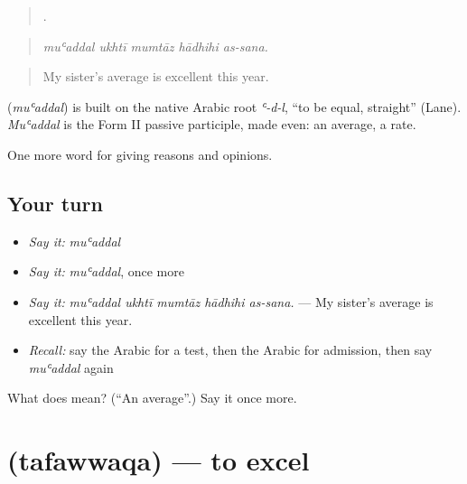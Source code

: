 \begin{quote}
    .
\end{quote}

\begin{quote}
\emph{muʿaddal ukhtī mumtāz hādhihi as-sana.}
\end{quote}

\begin{quote}
My sister's average is excellent this year.
\end{quote}

\begin{cousinweb}
\textbf{} (\emph{muʿaddal}) is built on the native Arabic root \emph{ʿ-d-l}, \textquotedblleft{}to be equal, straight\textquotedblright{} (Lane). \emph{Muʿaddal} is the Form II passive participle, made even: an average, a rate.
\end{cousinweb}

\begin{grammarlens}[title={What you've built}]
One more word for giving reasons and opinions.
\end{grammarlens}

\subsection*{Your turn}
\begin{itemize}
\raggedright
  \item \emph{Say it:} \emph{muʿaddal}
  \item \emph{Say it:} \emph{muʿaddal}, once more
  \item \emph{Say it:} \emph{muʿaddal ukhtī mumtāz hādhihi as-sana.} — My sister's average is excellent this year.
  \item \emph{Recall:} say the Arabic for a test, then the Arabic for admission, then say \emph{muʿaddal} again
\end{itemize}

\begin{tcolorbox}[breakable,colback=teal!4,colframe=teal!35!black,title={Before you move on}]
What does  mean? (\textquotedblleft{}An average\textquotedblright{}.) Say it once more.
\end{tcolorbox}
\section[\texorpdfstring{\ar{تفوق} (tafawwaqa)}{تفوق (tafawwaqa)}]{ (tafawwaqa) — to excel}

